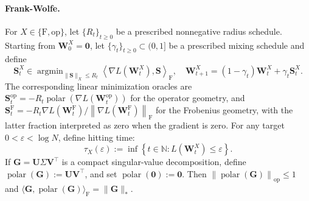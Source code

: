 \documentclass[11pt]{article}
\theoremstyle{definition}
\newcommand{\Gb}{\mathbf{G}}
\newcommand{\Sb}{\mathbf{S}}
\newcommand{\Ub}{\mathbf{U}}
\newcommand{\Vb}{\mathbf{V}}
\newcommand{\Wb}{\mathbf{W}}
\newcommand{\eps}{\varepsilon}
\newcommand{\normF}[1]{\left\lVert #1\right\rVert_{\mathrm F}}
\newcommand{\normop}[1]{\left\lVert #1\right\rVert_{\mathrm{op}}}
\DeclareMathOperator{\polar}{polar}
\begin{document}
\paragraph{Frank-Wolfe.}
For $X\in\{\mathrm F,\mathrm{op}\}$, let
$\{R_t\}_{t\geq0}$ be a prescribed nonnegative radius schedule.
Starting from $\Wb_0^X=\mathbf 0$, let $\{\gamma_t\}_{t\geq0}\subset(0,1]$
be a prescribed mixing schedule and define
\[
 \Sb_t^X\in \mathop{\arg\min}_{\|\Sb\|_X\leq R_t} \left\langle
 \nabla L(\Wb_t^X),\Sb
 \right\rangle_{\mathrm F},
 \quad
 \Wb_{t+1}^X=(1-\gamma_t)\Wb_t^X+\gamma_t\Sb_t^X.
\]
The corresponding linear minimization oracles are
$\Sb_t^{\mathrm{op}}=-R_t\polar\left(\nabla L(\Wb_t^{\mathrm{op}})\right)$
for the operator geometry, and
$\Sb_t^{\mathrm F}=-R_t\nabla L(\Wb_t^{\mathrm F})/\normF{\nabla L(\Wb_t^{\mathrm F})}
$
for the Frobenius geometry, with the latter fraction interpreted as zero
when the gradient is zero. For any target $0<\eps<\log N$, define hitting time:
\[
 \tau_X(\eps)
 :=
 \inf\left\{
 t\in\mathbb N:
 L(\Wb_t^X)\leq\eps
 \right\}.
\]
If $\Gb=\Ub\Sigma\Vb^\top$ is a compact singular-value decomposition,
define $\polar(\Gb):=\Ub\Vb^\top$, and set
$\polar(\mathbf0):=\mathbf0$.  Then
$\normop{\polar(\Gb)}\leq1$ and
$\langle\Gb,\polar(\Gb)\rangle_{\mathrm F}=\|\Gb\|_*$.

\end{document}
